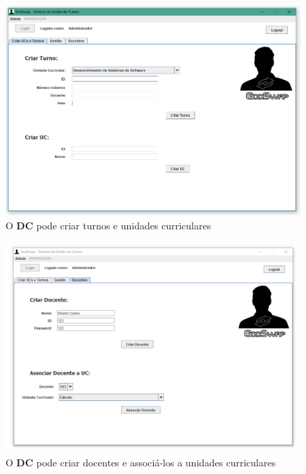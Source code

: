 \documentclass[a4paper]{article}
\begin{document}
\begin{figure}[H]
\centering
\includegraphics[width=13.5cm]{IcriarADMIN}
\caption{O \textbf{DC} pode criar turnos e unidades curriculares}
\label{}
\end{figure}

\begin{figure}[H]
\centering
\includegraphics[width=13.5cm]{IdocentesADMIN}
\caption{O \textbf{DC} pode criar docentes e associá-los a unidades curriculares}
\label{}
\end{figure}
\end{document}
